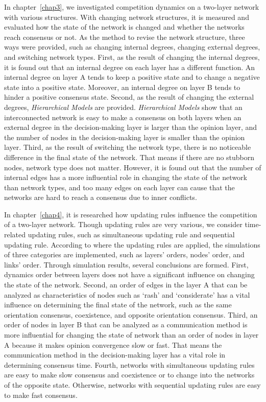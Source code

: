 In chapter~\ref{chap3}, we investigated competition dynamics on a two-layer network with various structures. With changing network structures, it is measured and evaluated how the state of the network is changed and whether the networks reach consensus or not. As the method to revise the network structure, three ways were provided, such as changing internal degrees, changing external degrees, and switching network types. First, as the result of changing the internal degrees, it is found out that an internal degree on each layer has a different function. An internal degree on layer A tends to keep a positive state and to change a negative state into a positive state. Moreover, an internal degree on layer B tends to hinder a positive consensus state. Second, as the result of changing the external degrees, \textit{Hierarchical Models} are provided. \textit{Hierarchical Models} show that an interconnected network is easy to make a consensus on both layers when an external degree in the decision-making layer is larger than the opinion layer, and the number of nodes in the decision-making layer is smaller than the opinion layer. Third, as the result of switching the network type, there is no noticeable difference in the final state of the network. That means if there are no stubborn nodes, network type does not matter. However, it is found out that the number of internal edges has a more influential role in changing the state of the network than network types, and too many edges on each layer can cause that the networks are hard to reach a consensus due to inner conflicts.

In chapter~\ref{chap4}, it is researched how updating rules influence the competition of a two-layer network. Though updating rules are very various, we consider time-related updating rules, such as simultaneous updating rule and sequential updating rule. According to where the updating rules are applied, the simulations of three categories are implemented, such as layers' orders,  nodes' order, and links' order. Through simulation results, several conclusions are formed. First, dynamics order between layers does not have a significant influence on changing the state of the network. Second, an order of edges in the layer A that can be analyzed as characteristics of nodes such as `rash' and `considerate' has a vital influence on determining the final state of the network, such as the same orientation consensus, coexistence, and opposite orientation consensus. Third, an order of nodes in layer B that can be analyzed as a communication method is more influential for changing the state of network than an order of nodes in layer A because it makes opinion convergence slow or fast. That means the communication method in the decision-making layer has a vital role in determining consensus time. Fourth, networks with simultaneous updating rules are easy to make slow consensus and coexistence or to change into the networks of the opposite state. Otherwise, networks with sequential updating rules are easy to make fast consensus.

